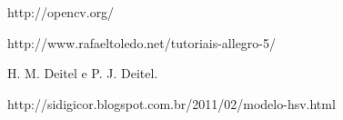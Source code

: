 \documentclass{sciposter}
\begin{document}
\begin{multicols}{3}
\begin{thebibliography}{7}
http://opencv.org/ \\

 http://www.rafaeltoledo.net/tutoriais-allegro-5/ \\

H. M. Deitel e P. J. Deitel.

\bibitem *http://sidigicor.blogspot.com.br/2011/02/modelo-hsv.html \\


\end{thebibliography}

\end{multicols}
\end{document}
